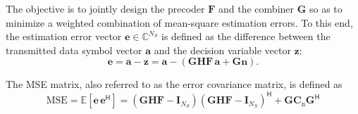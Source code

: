 The objective is to jointly design the precoder $\mathbf{F}$ and the combiner $\mathbf{G}$ so as to minimize a weighted combination of mean-square estimation errors.
To this end, the estimation error vector $\mathbf{e} \in \mathbb{C}^{N_S}$ is defined as the difference between the transmitted data symbol vector $\mathbf{a}$ and the decision variable vector $\mathbf{z}$:
\begin{equation}
\label{eq:error_vector}
    \mathbf{e} 
    = \mathbf{a} - \mathbf{z} 
    = \mathbf{a} - (\mathbf{G}\mathbf{H}\mathbf{F}\,\mathbf{a} + \mathbf{G}\mathbf{n}).
\end{equation}

The \ac{MSE} matrix, also referred to as the error covariance matrix, is defined as
\begin{equation}
\label{eq:mse_matrix}
    \text{MSE} 
    = \mathbb{E}\!\left[\mathbf{e}\, \mathbf{e}^{\mathsf{H}}\right]
    = (\mathbf{G}\mathbf{H}\mathbf{F} - \mathbf{I}_{N_S})(\mathbf{G}\mathbf{H}\mathbf{F} - \mathbf{I}_{N_S})^{\mathsf{H}} + \mathbf{G} \mathbf{C}_{\mathrm{n}} \mathbf{G}^{\mathsf{H}}
\end{equation}
